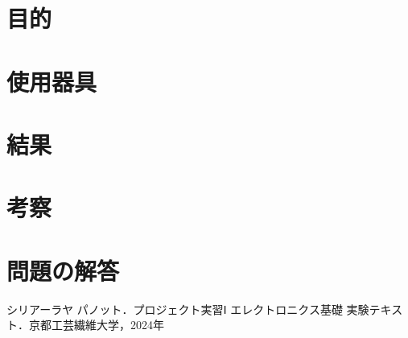 \documentclass{jlreq}
\numberwithin{equation}{section}
\begin{document}
\tableofcontents
\clearpage

\section{目的}

\section{使用器具}

\section{結果}

\section{考察}

\section{問題の解答}

\begin{thebibliography}{9}
  \item シリアーラヤ パノット．プロジェクト実習Ⅰ エレクトロニクス基礎 実験テキスト．京都工芸繊維大学，2024年
\end{thebibliography}
\end{document}
